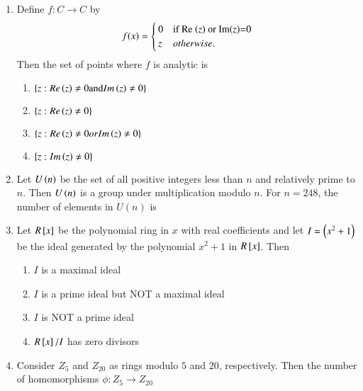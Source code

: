 \documentclass[journal]{IEEEtran}
\begin{document}
\begin{enumerate}
\begin{enumerate}
		\end{enumerate}
	\item Define $f: C \rightarrow C$ by 
         \begin{align*}
               f(x) = 
\begin{cases} 
    0 & \text{if Re \ensuremath{\left(z\right)} or Im\ensuremath{\left(z\right)}=0} \\
    z & otherwise.
\end{cases}
         \end{align*}
 Then the set of points where $f$ is analytic is
		\begin{enumerate}
			\item $\left\{z: Re \left(z\right) \neq 0 \text{and} Im \left(z\right) \neq 0\right\}$
			\item $\left\{z: Re\left(z\right) \neq 0\right\}$
			\item $\left\{z: Re \left(z\right) \neq 0 or Im \left(z\right) \neq 0\right\}$
	        \item $\left\{z: Im \left(z\right) \neq 0\right\}$
        	\end{enumerate}
	\item Let $U\left(n\right)$ be the set of all positive integers less than $n$ and relatively prime to $n$. Then $U\left(n\right)$ is a group under multiplication modulo $n$. For $n=248$, the number of elements in $U(n)$ is
		\begin{enumerate}
        	\end{enumerate}	
	\item Let $ R {}\left[x\right]$ be the polynomial ring in $x$ with real coefficients and let $I=\left( x^{2}+1\right)$ be the ideal generated by the polynomial $x^{2}+1$ in $R{}\left[x\right]$. Then
		\begin{enumerate}
			\item $I$ is a maximal ideal
			\item $I$ is a prime ideal but NOT a maximal ideal
			\item $I$ is NOT a prime ideal
			\item $R{}\left[x\right] / I$ has zero divisors
        	\end{enumerate}
	\item Consider $Z_5$ and $Z_{20}$ as rings modulo $5$ and $20 $, respectively. Then the number of homomorphisms $\phi : Z_5 \rightarrow  Z_{20}$ 

\end{enumerate}
\end{document}
